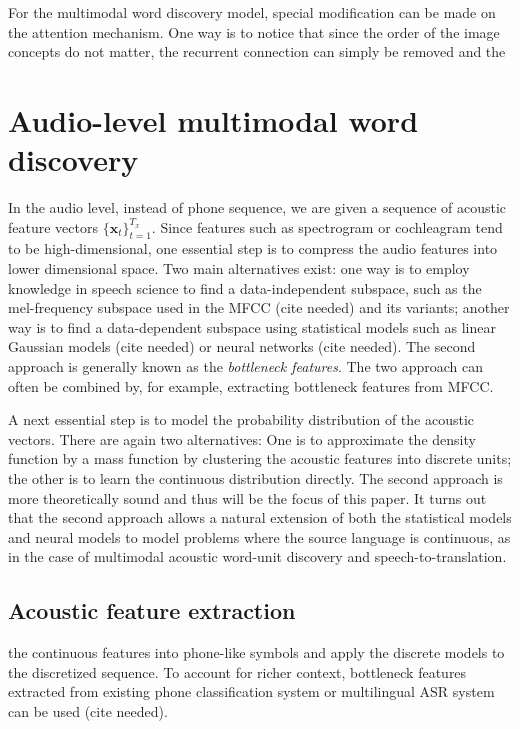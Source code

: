 \documentclass[journal]{IEEEtran}
\begin{document}
For the multimodal word discovery model, special modification can be made on the attention mechanism. One way is to notice that since the order of the image concepts do not matter, the recurrent connection can simply be removed and the 

\section{Audio-level multimodal word discovery}
In the audio level, instead of phone sequence, we are given a sequence of acoustic feature vectors $\{\mathbf x_t\}_{t=1}^{T_x}$.  
Since features such as spectrogram or cochleagram tend to be high-dimensional, one essential step is to compress the audio features into lower dimensional space. Two main alternatives exist: one way is to employ knowledge in speech science to find a data-independent subspace, such as the mel-frequency subspace used in the MFCC (cite needed) and its variants; another way is to find a data-dependent subspace using statistical models such as linear Gaussian models (cite needed) or neural networks (cite needed). The second approach is generally known as the \textit{bottleneck features}. The two approach can often be combined by, for example, extracting bottleneck features from MFCC.

A next essential step is to model the probability distribution of the acoustic vectors. There are again two alternatives: One is to approximate the density function by a mass function by clustering the acoustic features into discrete units; the other is to learn the continuous distribution directly. The second approach is more theoretically sound and thus will be the focus of this paper. It turns out that the second approach allows a natural extension of both the statistical models \cite{Brown92} and neural models \cite{Bahdanau14} to model problems where the source language is continuous, as in the case of multimodal acoustic word-unit discovery and speech-to-translation.

\subsection{Acoustic feature extraction}
the continuous features into phone-like symbols and apply the discrete models to the discretized sequence. To account for richer context, bottleneck features extracted from existing phone classification system or multilingual ASR system can be used (cite needed). 
\end{document}
